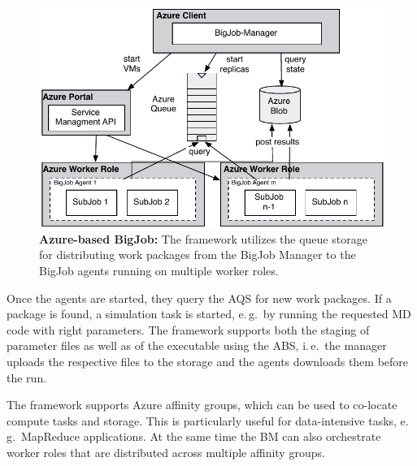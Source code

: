 \documentclass[conference,final]{IEEEtran}
\newcommand{\up}{\vspace*{-1em}}
\newcommand{\alnote}[1]{ {\textcolor{blue} { ***AL: #1 }}}
\newcommand{\alnote}[1]{}
\begin{document}

\begin{figure}
    \centering
    \includegraphics[width=.4\textwidth]{figures/bigjob_azure}
    \caption{\textbf{Azure-based BigJob:} The framework
      utilizes the queue storage for distributing work
      packages from the BigJob Manager to the
      BigJob agents running on multiple worker roles.}
    \label{fig:figures_bigjob_azure}
    \up\up
\end{figure}

Once the agents are started, they query the AQS for new work
packages.  If a package is found, a simulation task is started, e.\,g.\
by running the requested MD code with right parameters. The framework
supports both the staging of parameter files as well as of the
executable using the ABS, i.\,e.\ the manager
uploads the respective files to the storage and the agents downloads
them before the run.

The framework supports Azure affinity groups, which
can be used to co-locate compute tasks and storage. This is
particularly useful for data-intensive tasks, e.\,g.\ MapReduce
applications. At the same time the BM can also orchestrate worker roles that
are distributed across multiple affinity groups.




\up
\end{document}
